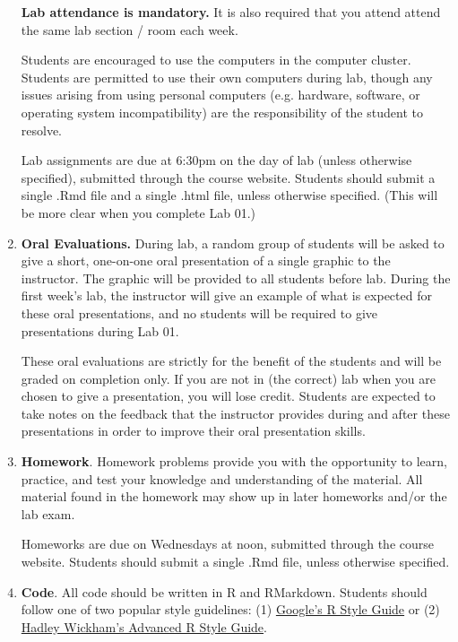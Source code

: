 \documentclass[11pt]{article}
\begin{document}
\begin{enumerate}
\textbf{Lab attendance is mandatory.}  It is also required that you attend attend the same lab section / room each week.

Students are encouraged to use the computers in the computer cluster.  Students are permitted to use their own computers during lab, though any issues arising from using personal computers (e.g. hardware, software, or operating system incompatibility) are the responsibility of the student to resolve.

Lab assignments are due at 6:30pm on the day of lab (unless otherwise specified), submitted through the course website.  Students should submit a single .Rmd file and a single .html file, unless otherwise specified.  (This will be more clear when you complete Lab 01.)

\item {\bf Oral Evaluations.} During lab, a random group of students will be asked to give a short, one-on-one oral presentation of a single graphic to the instructor.  The graphic will be provided to all students before lab.  During the first week's lab, the instructor will give an example of what is expected for these oral presentations, and no students will be required to give presentations during Lab 01.

These oral evaluations are strictly for the benefit of the students and will be graded on completion only.  If you are not in (the correct) lab when you are chosen to give a presentation, you will lose credit.  Students are expected to take notes on the feedback that the instructor provides during and after these presentations in order to improve their oral presentation skills.

\item {\bf Homework}. 
Homework problems provide you with the opportunity to learn, practice, and test your knowledge and understanding of the material.  All material found in the homework may show up in later homeworks and/or the lab exam.

Homeworks are due on Wednesdays at noon, submitted through the course website.  Students should submit a single .Rmd file, unless otherwise specified.

\item {\bf Code}.  All code should be written in R and RMarkdown.  Students should follow one of two popular style guidelines:  (1) \href{https://google.github.io/styleguide/Rguide.xml}{Google's R Style Guide} or (2) \href{http://adv-r.had.co.nz/Style.html}{Hadley Wickham's Advanced R Style Guide}.


\end{enumerate}
\end{document}
